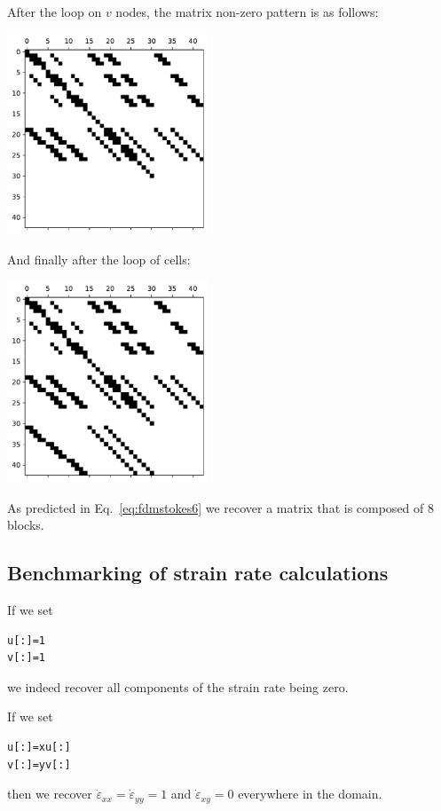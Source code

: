 After the loop on $v$ nodes, the matrix non-zero pattern is as follows:
\begin{center}
\includegraphics[width=6cm]{python_codes/fieldstone_158/images/matrix_uv.pdf}
\end{center}

And finally after the loop of cells:
\begin{center}
\includegraphics[width=6cm]{python_codes/fieldstone_158/images/matrix_uvp.pdf}
\end{center}
As predicted in Eq.~\eqref{eq:fdmstokes6} we recover a matrix that 
is composed of 8 blocks.


\subsection*{Benchmarking of strain rate calculations}

If we set 
\begin{lstlisting}
u[:]=1
v[:]=1
\end{lstlisting}
we indeed recover all components of the strain rate being zero.

If we set 
\begin{lstlisting}
u[:]=xu[:]
v[:]=yv[:]
\end{lstlisting}
then we recover $\dot{\varepsilon}_{xx}=\dot{\varepsilon}_{yy}=1$
and $\dot{\varepsilon}_{xy}=0$ everywhere in the domain.


